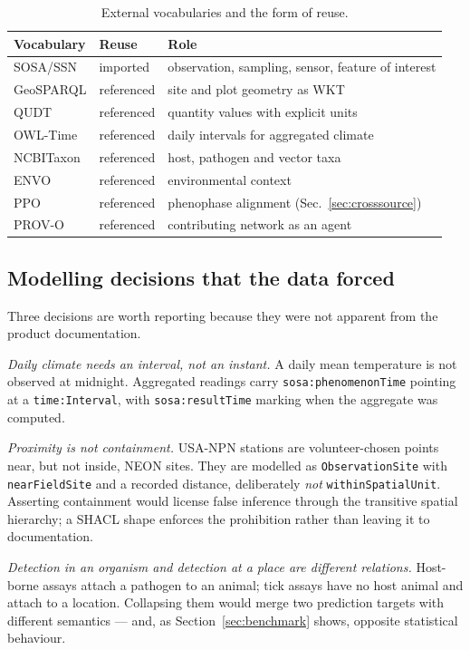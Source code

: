 \begin{table}[t]
\centering
\caption{External vocabularies and the form of reuse.}
\label{tab:reuse}
\small
\begin{tabular}{llp{6.6cm}}
\toprule
\textbf{Vocabulary} & \textbf{Reuse} & \textbf{Role} \\
\midrule
SOSA/SSN      & imported  & observation, sampling, sensor, feature of interest \\
GeoSPARQL     & referenced & site and plot geometry as WKT \\
QUDT          & referenced & quantity values with explicit units \\
OWL-Time      & referenced & daily intervals for aggregated climate \\
NCBITaxon     & referenced & host, pathogen and vector taxa \\
ENVO          & referenced & environmental context \\
PPO           & referenced & phenophase alignment (Sec.~\ref{sec:crosssource}) \\
PROV-O        & referenced & contributing network as an agent \\
\bottomrule
\end{tabular}
\end{table}

\subsection{Modelling decisions that the data forced}

Three decisions are worth reporting because they were not apparent from the
product documentation.

\emph{Daily climate needs an interval, not an instant.} A daily mean
temperature is not observed at midnight. Aggregated readings carry
\texttt{sosa:phenomenonTime} pointing at a \texttt{time:Interval}, with
\texttt{sosa:resultTime} marking when the aggregate was computed.

\emph{Proximity is not containment.} USA-NPN stations are volunteer-chosen
points near, but not inside, NEON sites. They are modelled as
\texttt{ObservationSite} with \texttt{nearFieldSite} and a recorded distance,
deliberately \emph{not} \texttt{withinSpatialUnit}. Asserting containment would
license false inference through the transitive spatial hierarchy; a SHACL shape
enforces the prohibition rather than leaving it to documentation.

\emph{Detection in an organism and detection at a place are different
relations.} Host-borne assays attach a pathogen to an animal; tick assays have
no host animal and attach to a location. Collapsing them would merge two
prediction targets with different semantics --- and, as
Section~\ref{sec:benchmark} shows, opposite statistical behaviour.

